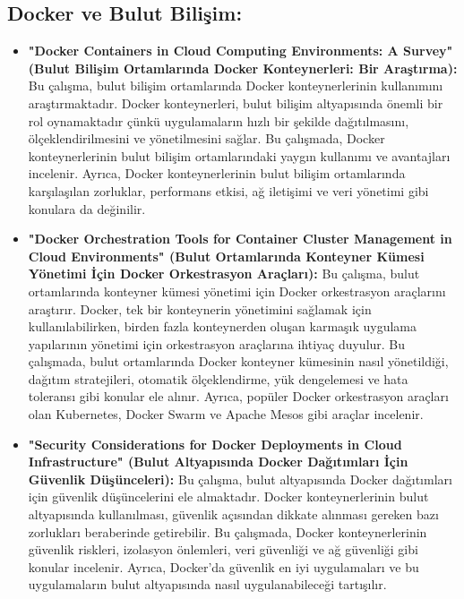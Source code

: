 \subsection{Docker ve Bulut Bilişim:}
\begin{itemize}
 \item \textbf{"Docker Containers in Cloud Computing Environments: A Survey" (Bulut Bilişim Ortamlarında Docker Konteynerleri: Bir Araştırma):}
 Bu çalışma, bulut bilişim ortamlarında Docker konteynerlerinin kullanımını araştırmaktadır. Docker konteynerleri, bulut bilişim altyapısında önemli bir rol oynamaktadır çünkü uygulamaların hızlı bir şekilde dağıtılmasını, ölçeklendirilmesini ve yönetilmesini sağlar. Bu çalışmada, Docker konteynerlerinin bulut bilişim ortamlarındaki yaygın kullanımı ve avantajları incelenir. Ayrıca, Docker konteynerlerinin bulut bilişim ortamlarında karşılaşılan zorluklar, performans etkisi, ağ iletişimi ve veri yönetimi gibi konulara da değinilir.\\
 \item \textbf{"Docker Orchestration Tools for Container Cluster Management in Cloud Environments" (Bulut Ortamlarında Konteyner Kümesi Yönetimi İçin Docker Orkestrasyon Araçları):}
 Bu çalışma, bulut ortamlarında konteyner kümesi yönetimi için Docker orkestrasyon araçlarını araştırır. Docker, tek bir konteynerin yönetimini sağlamak için kullanılabilirken, birden fazla konteynerden oluşan karmaşık uygulama yapılarının yönetimi için orkestrasyon araçlarına ihtiyaç duyulur. Bu çalışmada, bulut ortamlarında Docker konteyner kümesinin nasıl yönetildiği, dağıtım stratejileri, otomatik ölçeklendirme, yük dengelemesi ve hata toleransı gibi konular ele alınır. Ayrıca, popüler Docker orkestrasyon araçları olan Kubernetes, Docker Swarm ve Apache Mesos gibi araçlar incelenir.\\
\item \textbf {"Security Considerations for Docker Deployments in Cloud Infrastructure" (Bulut Altyapısında Docker Dağıtımları İçin Güvenlik Düşünceleri):}
 Bu çalışma, bulut altyapısında Docker dağıtımları için güvenlik düşüncelerini ele almaktadır. Docker konteynerlerinin bulut altyapısında kullanılması, güvenlik açısından dikkate alınması gereken bazı zorlukları beraberinde getirebilir. Bu çalışmada, Docker konteynerlerinin güvenlik riskleri, izolasyon önlemleri, veri güvenliği ve ağ güvenliği gibi konular incelenir. Ayrıca, Docker'da güvenlik en iyi uygulamaları ve bu uygulamaların bulut altyapısında nasıl uygulanabileceği tartışılır.
\end{itemize}
